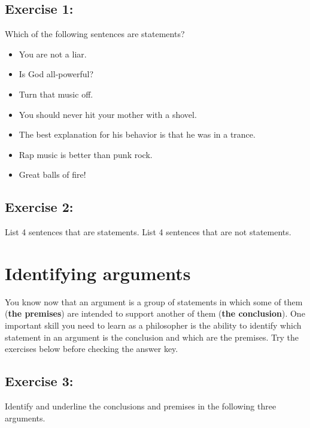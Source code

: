 \documentclass[report,oneside]{memoir}
\begin{document}
\subsection{Exercise 1:}
\label{exercise1:}
Which of the following sentences are statements?

\begin{itemize}
\item You are not a liar.

\item Is God all-powerful?

\item Turn that music off.

\item You should never hit your mother with a shovel.

\item The best explanation for his behavior is that he was in a trance.

\item Rap music is better than punk rock.

\item Great balls of fire!

\end{itemize}
\subsection{Exercise 2:}
\label{exercise2:}

List 4 sentences that are statements. List 4 sentences that are not statements. 

\section{Identifying arguments}
\label{identifyingarguments}
You know now that an argument is a group of statements in which some of them (\textbf{the premises}) are intended to support another of them (\textbf{the conclusion}). One important skill you need to learn as a philosopher is the ability to identify which statement in an argument is the conclusion and which are the premises. Try the exercises below before checking the answer key. 

\subsection{Exercise 3:}
\label{exercise3:}

Identify and underline the conclusions and premises in the following three arguments. 
\end{document}
